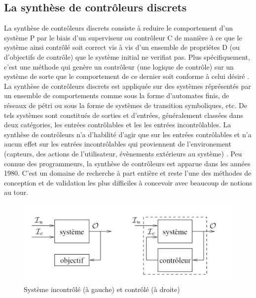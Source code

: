 \documentclass{svjour3}
\begin{document}
\subsection{La synthèse de contrôleurs discrets}
La synthèse de contrôleurs discrets consiste à reduire le comportement d'un système P par le biais d'un superviseur ou contrôleur C de manière 
à ce que le système ainsi contrôlé soit correct vis à vis d'un ensemble de propriétes D (ou d'objectifs de contrôle) que le système initial ne verifiat pas. 
Plus spécifiquement, c'est une méthode qui genère un contrôleur (une logique de contrôle) sur un système de sorte que le comportement de ce dernier 
soit conforme à celui désiré \cite{ref8}. La synthèse de contrôleurs discrets est appliquée sur des systèmes réprésentés par un ensemble de comportements 
comme sous la forme d'automates finis, de réseaux de pétri ou sous la forme de systèmes de transition symboliques, etc. De tels systèmes sont constitués de sorties
et d'entrées, généralement classées dans deux catégories, les entrées contrôlables et les les entrées incontrôlables. La synthèse de contrôleurs n'a d'habilité 
d'agir que sur les entrées contrôlables et n'a aucun effet sur les entrées incontrôlables qui proviennent de l'environement (capteurs, des actions de l'utilisateur, 
évènements extérieurs au système) \cite{drm13}.  Peu connue des programmeurs, la synthèse de contrôleurs est apparue dans les ann\'ees 1980. C'est un domaine
de recherche à part entière et reste l'une des m\'ethodes de conception et de validation les plus difficiles à concevoir avec beaucoup de notions au tour.
\begin{figure}[!h]
\includegraphics[height= 10 cm,width=15cm]{controleur.png}
 \caption{Système incontrôlé (à gauche) et contrôlé (à droite) \textit{\cite {Dumitrescu07b}}}
 \label{schemaControleur}
\end{figure}
\newpage
\end{document}
